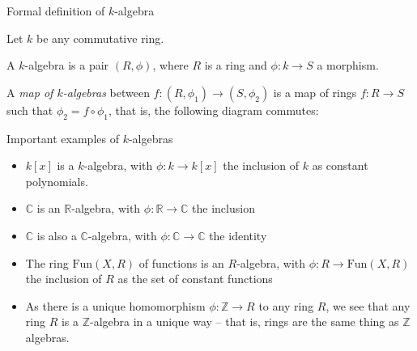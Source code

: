 \documentclass{beamer}
\newcommand{\C}{\mathbb{C}}
\newcommand{\Z}{\mathbb{Z}}
\newcommand{\R}{\mathbb{R}}
\begin{document}
\begin{frame}[fragile]{Formal definition of $k$-algebra}

Let $k$ be any commutative ring. 

\begin{definition} A $k$-algebra is a pair $(R,\phi)$, where $R$ is a ring and $\phi:k\to S$ a morphism.
\end{definition}


\begin{definition} A \emph{map of $k$-algebras} between $f:(R,\phi_1)\to (S,\phi_2)$ is a map of rings $f:R\to S$ such that $\phi_2=f\circ\phi_1$, that is, the following diagram commutes:
\begin{center}
\end{center}



\end{definition}








\end{frame}


\begin{frame}[fragile]{Important examples of $k$-algebras}

\begin{itemize}
\item $k[x]$ is a $k$-algebra, with $\phi:k\to k[x]$ the inclusion of $k$ as constant polynomials.
\item $\C$ is an $\R$-algebra, with $\phi:\R\to \C$ the inclusion
\item $\C$ is also a $\C$-algebra, with $\phi:\C\to \C$ the identity

\item The ring $\textrm{Fun}(X,R)$ of functions is an $R$-algebra, with $\phi:R\to\textrm{Fun}(X,R)$ the inclusion of $R$ as the set of constant functions 

\item As there is a unique homomorphism $\phi:\Z\to R$ to any ring $R$, we see that any ring $R$ is a $\Z$-algebra in a unique way -- that is, rings are the same thing as $\Z$ algebras.
\end{itemize}
\end{frame}
\end{document}
